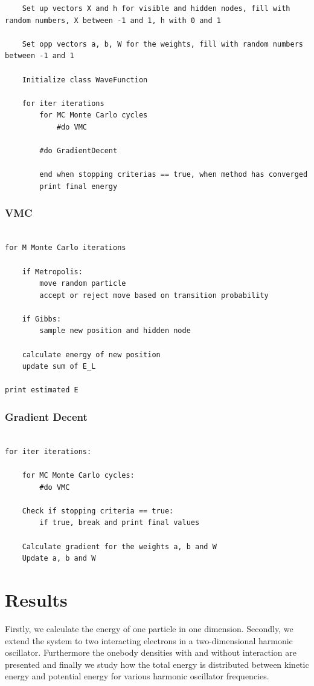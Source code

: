 \documentclass[norsk,a4paper,12pt]{article}
\begin{document}
\begin{lstlisting}
	Set up vectors X and h for visible and hidden nodes, fill with random numbers, X between -1 and 1, h with 0 and 1
	
	Set opp vectors a, b, W for the weights, fill with random numbers between -1 and 1
	
	Initialize class WaveFunction
	
	for iter iterations
		for MC Monte Carlo cycles
			#do VMC
		
		#do GradientDecent
		
		end when stopping criterias == true, when method has converged
		print final energy
\end{lstlisting}

\subsubsection{VMC}

\lstset{basicstyle=\scriptsize}
\begin{lstlisting}

for M Monte Carlo iterations
	
	if Metropolis:
		move random particle
		accept or reject move based on transition probability
		
	if Gibbs:
		sample new position and hidden node
		
	calculate energy of new position
	update sum of E_L

print estimated E 

\end{lstlisting}

\subsubsection{Gradient Decent}

\lstset{basicstyle=\scriptsize}
\begin{lstlisting}

for iter iterations:
	
	for MC Monte Carlo cycles:
		#do VMC
		
	Check if stopping criteria == true:
		if true, break and print final values
		
	Calculate gradient for the weights a, b and W
	Update a, b and W

\end{lstlisting}


\section{Results} \label{sec:Results}
Firstly, we calculate the energy of one particle in one dimension. Secondly, we extend the system to two interacting electrons in a two-dimensional harmonic oscillator. Furthermore the onebody densities with and without interaction are presented and finally we study how the total energy is distributed between kinetic energy and potential energy for various harmonic oscillator frequencies. 
\end{document}
